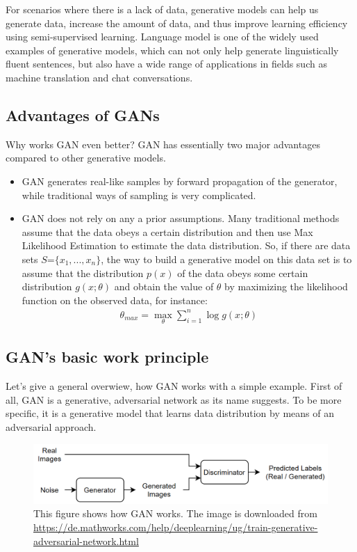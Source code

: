 \documentclass[10pt,twocolumn,letterpaper]{article}
\begin{document}
For scenarios where there is a lack of data, generative models can help us generate data, increase the amount of data, and thus improve learning efficiency using semi-supervised learning\cite{chapelle2009semi}. Language model is one of the widely used examples of generative models, which can not only help generate linguistically fluent sentences, but also have a wide range of applications in fields such as machine translation and chat conversations.

\subsection{Advantages of GANs}
Why works GAN even better? GAN has essentially two major advantages compared to other generative models.
\begin{itemize}
    \item GAN generates real-like samples by forward propagation of the generator, while traditional ways of sampling is very complicated.
    \item GAN does not rely on any a prior assumptions. Many traditional methods assume that the data obeys a certain distribution and then use Max Likelihood Estimation\cite{MYUNG200390} to estimate the data distribution. So, if there are data sets $S$=$\{x_1,...,x_n\}$, the way to build a generative model on this data set is to assume that the distribution $p(x)$ of the data obeys some certain distribution $g(x; \theta)$ and obtain the value of $\theta$ by maximizing the likelihood function on the observed data, for instance:
    \begin{align*}
        \theta_{max} = \max\limits_{\theta}\sum_{i=1}^{n}\log{g(x;\theta)}
    \end{align*}
    
\end{itemize}

\subsection{GAN's basic work principle}
Let's give a general overwiew, how GAN works with a simple example. First of all, GAN is a generative, adversarial network as its name suggests. To be more specific, it is a generative model that learns data distribution by means of an adversarial approach. 
\begin{figure}[htpb]
\begin{center}
   \includegraphics[width=1\linewidth]{images/TrainGenerativeAdversarialNetworkGANExample_01.png}
\end{center}
   \caption{\footnotesize This figure shows how GAN works. The image is downloaded from \href{https://de.mathworks.com/help/deeplearning/ug/train-generative-adversarial-network.html}{https://de.mathworks.com/help/deeplearning/ug/train-generative-adversarial-network.html}}
\end{figure}
\end{document}
